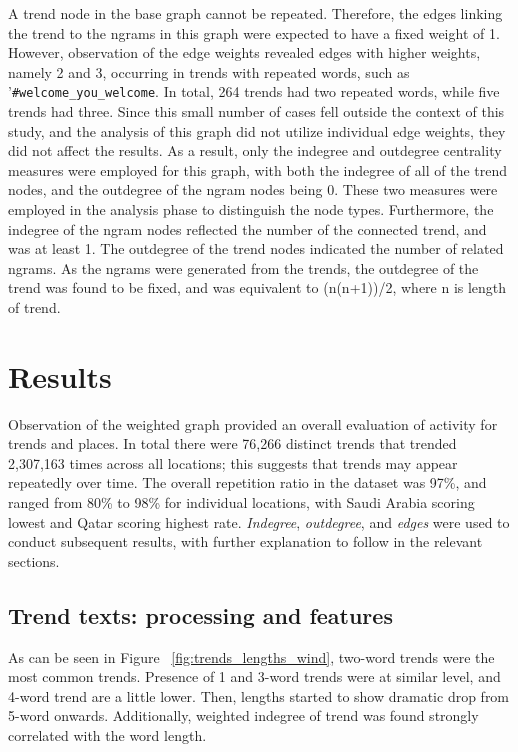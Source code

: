 \documentclass[conference]{IEEEtran}
\begin{document}
A trend node in the base graph cannot be repeated. Therefore, the edges linking 
the trend to the ngrams in this graph were expected to have a fixed weight of 1. 
However, observation of the edge weights revealed edges with higher weights, namely 
2 and 3, occurring in trends with repeated words, such as '{\texttt{\#welcome\_you\_welcome}}.
In total, 264 trends had two repeated words, while five trends had three. Since this small number 
of cases fell outside the context of this study, and the analysis of this graph did not utilize individual 
edge weights, they did not affect the results. As a result, only the indegree and outdegree 
centrality measures were employed for this graph, with both the indegree of all of the trend nodes, 
and the outdegree of the ngram nodes being 0. These two measures were employed in the analysis 
phase to distinguish the node types. Furthermore, the indegree of the ngram nodes reflected the 
number of the connected trend, and was at least 1. The outdegree of the trend nodes indicated 
the number of related ngrams. As the ngrams were generated from the trends, the outdegree of 
the trend was found to be fixed, and was equivalent to (n(n+1))/2, where n is length of trend.

\section{Results}\label{results}

Observation of the weighted graph provided an overall evaluation of
activity for trends and places. In total there were 76,266 distinct
trends that trended 2,307,163 times across all locations; this
suggests that trends may appear repeatedly over time. The overall
repetition ratio in the dataset was 97\%, and ranged from 80\% to 98\%
for individual locations, with Saudi Arabia scoring lowest and Qatar
scoring highest rate. {\emph{Indegree}}, {\emph{outdegree}}, and
{\emph{edges}} were used to conduct subsequent results, with further
explanation to follow in the relevant sections.

\subsection{Trend texts: processing and features}
As can be seen in  Figure ~\ref{fig:trends_lengths_wind}, two-word trends 
were the most common trends. Presence of 1 and 3-word trends were at 
similar level, and 4-word trend are a little lower. Then, lengths started to 
show dramatic drop from 5-word onwards. Additionally, weighted indegree 
of trend was found strongly correlated with the word length.
\end{document}
